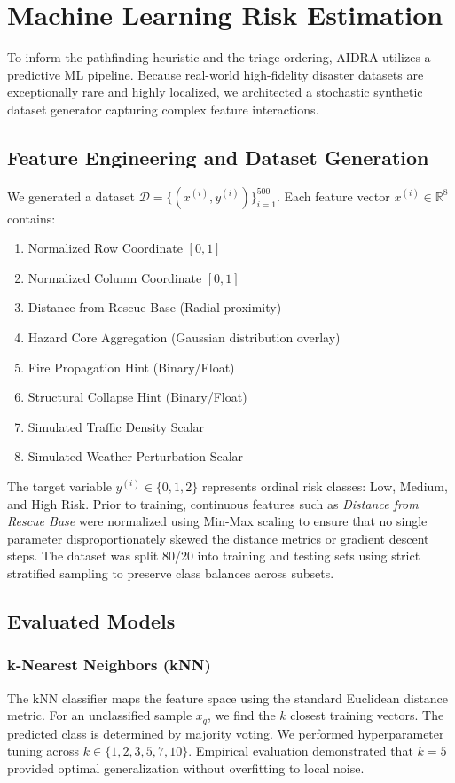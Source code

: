 \documentclass[conference]{IEEEtran}
\begin{document}
\section{Machine Learning Risk Estimation}

To inform the pathfinding heuristic and the triage ordering, AIDRA utilizes a predictive ML pipeline. Because real-world high-fidelity disaster datasets are exceptionally rare and highly localized, we architected a stochastic synthetic dataset generator capturing complex feature interactions.

\subsection{Feature Engineering and Dataset Generation}
We generated a dataset $\mathcal{D} = \{ (x^{(i)}, y^{(i)}) \}_{i=1}^{500}$. Each feature vector $x^{(i)} \in \mathbb{R}^8$ contains:
\begin{enumerate}
    \item Normalized Row Coordinate $[0, 1]$
    \item Normalized Column Coordinate $[0, 1]$
    \item Distance from Rescue Base (Radial proximity)
    \item Hazard Core Aggregation (Gaussian distribution overlay)
    \item Fire Propagation Hint (Binary/Float)
    \item Structural Collapse Hint (Binary/Float)
    \item Simulated Traffic Density Scalar
    \item Simulated Weather Perturbation Scalar
\end{enumerate}

The target variable $y^{(i)} \in \{0, 1, 2\}$ represents ordinal risk classes: Low, Medium, and High Risk. Prior to training, continuous features such as \textit{Distance from Rescue Base} were normalized using Min-Max scaling to ensure that no single parameter disproportionately skewed the distance metrics or gradient descent steps. The dataset was split 80/20 into training and testing sets using strict stratified sampling to preserve class balances across subsets.

\subsection{Evaluated Models}

\subsubsection{k-Nearest Neighbors (kNN)}
The kNN classifier maps the feature space using the standard Euclidean distance metric. For an unclassified sample $x_{q}$, we find the $k$ closest training vectors. The predicted class is determined by majority voting. We performed hyperparameter tuning across $k \in \{1, 2, 3, 5, 7, 10\}$. Empirical evaluation demonstrated that $k=5$ provided optimal generalization without overfitting to local noise.
\end{document}
